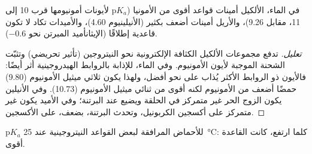 \begin{proposition}[القاعدية]\label{prop:b2:amines:basicity}
في الماء، الألكيل أمينات قواعد أقوى من الأمونيا ($\mathrm pK_a$ لأيونات أمونيومها
قرب 10 إلى 11، مقابل 9.26)، والأريل أمينات أضعف بكثير (الأنيلينيوم 4.60)، والأميدات تكاد لا تكون
قاعدية إطلاقًا (الإيثانأميد المبرتن نحو $-0.6$).
\end{proposition}

\begin{proof}[تعليل]
تدفع مجموعات الألكيل الكثافة الإلكترونية نحو النيتروجين (تأثير تحريضي) وتثبّت
الشحنة الموجبة لأيون الأمونيوم. وفي الماء، للإذابة بالروابط الهيدروجينية أثر أيضًا: فالأيون
ذو الروابط  الأكثر يُذاب على نحو أفضل، ولهذا يكون ثلاثي ميثيل الأمونيوم (9.80)
حمضًا أضعف من الأمونيوم لكنه أقوى من ثنائي ميثيل الأمونيوم (10.73). وفي الأنيلين يكون الزوج
الحر غير متمركز في الحلقة ويضيع عند البرتنة؛ وفي الأميد يكون غير متمركز
على أكسجين الكربونيل، وتحدث البرتنة، بضعف، على الأكسجين.
\end{proof}

\begin{omfigure}

{\small $\mathrm pK_a$ للأحماض المرافقة لبعض القواعد النيتروجينية عند
\qty{25}{\degreeCelsius}: كلما ارتفع، كانت القاعدة أقوى.}
\end{omfigure}

